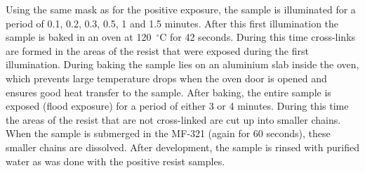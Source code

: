 Using the same mask as for the positive exposure, the sample is illuminated for a period of 0.1, 0.2, 0.3, 0.5, 1 and 1.5 minutes. After this first illumination the sample is baked in an oven at 120~$^\circ$C for 42 seconds. During this time cross-links are formed in the areas of the resist that were exposed during the first illumination. During baking the sample lies on an aluminium slab inside the oven, which prevents large temperature drops when the oven door is opened and ensures good heat transfer to the sample. After baking, the entire sample is exposed (flood exposure) for a period of either 3 or 4 minutes. During this time the areas of the resist that are not cross-linked are cut up into smaller chains. When the sample is submerged in the MF-321 (again for 60 seconds), these smaller chains are dissolved. After development, the sample is rinsed with purified water as was done with the positive resist samples\cite{az5214}.

